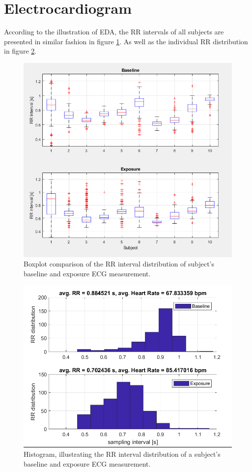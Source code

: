 \newpage
\section{Electrocardiogram}
According to the illustration of EDA, the RR intervals of all subjects are presented in similar fashion in figure \ref{ECGbpImg}. As well as the individual RR distribution in figure \ref{ECGhistoImg}.

\begin{figure}[h]
\centering
\includegraphics[width=1\textwidth]{images/ECGRRp.png}
\caption{Boxplot comparison of the RR interval distribution of subject's baseline and exposure ECG measurement.}
\label{ECGbpImg}
\end{figure}

\begin{figure}[h]
\centering
\includegraphics[width=1\textwidth]{images/ECGhisto.png}
\caption{Histogram, illustrating the RR interval distribution of a subject's baseline and exposure ECG measurement.}
\label{ECGhistoImg}
\end{figure}

